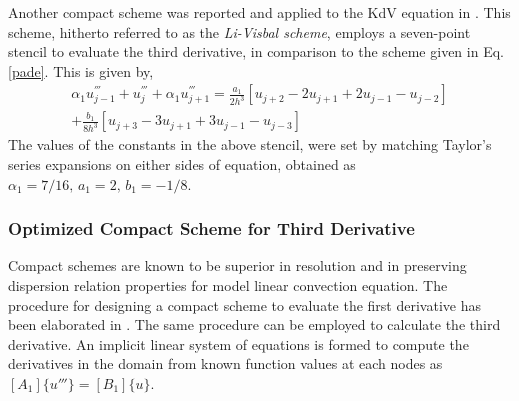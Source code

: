 \documentclass{svjour3}                    %
\begin{document}
Another compact scheme was reported and applied to the KdV equation in \cite{Li2006}. This scheme, hitherto referred to as the \textit{Li-Visbal scheme}, employs a seven-point stencil to evaluate the third derivative, in comparison to the scheme given in Eq. \eqref{pade}. This is given by,
\begin{equation}
\begin{aligned}
\label{eq:pade_li}
\alpha_1 u_{j-1}^{'''} +  u_{j}^{'''} + \alpha_1 u_{j+1}^{'''} 
= \frac{a_1}{2h^3}\left[u_{j+2}-2u_{j+1}+2u_{j-1}- u_{j-2}\right] \\
+ \frac{b_1}{8h^3}\left[u_{j+3}-3u_{j+1}+3u_{j-1}- u_{j-3}\right]
\end{aligned}
\end{equation}
The values of the constants in the above stencil, were set by matching Taylor's series expansions on either sides of equation, obtained as 
$\alpha_1 = 7/16,\,a_1= 2,\,b_1=-1/8$. 

\subsubsection{Optimized Compact Scheme for Third Derivative}
\label{subsec:OCS}
Compact schemes are known to be superior in resolution and in preserving dispersion relation properties for model linear convection equation. The procedure for designing a compact scheme to evaluate the first derivative has been elaborated in \cite{Sengupta2013a,Sengupta2006b}. The same procedure can be employed to calculate the third derivative. An implicit linear system of equations is formed to compute the derivatives in the domain from known function values at each nodes as $[A_1]\{u'''\} = [B_1]\{u\}$.
\end{document}
